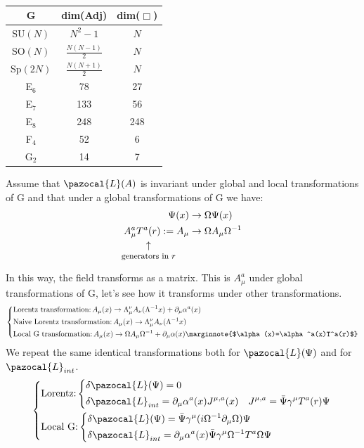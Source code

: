 \documentclass[../main.tex]{subfiles}
\begin{document}
\begin{table}[h]
    \centering
    \begin{tabular}{ccc}
    G & dim(Adj) & dim($\Box$) \\
    \hline
    SU$(N)$ & $N^2-1$ & $N$ \\
    SO$(N)$ & $\frac{N(N-1)}{2}$ & $N$ \\
    Sp$(2N)$ & $\frac{N(N+1)}{2}$ & $N$ \\
    E$_6$ & 78 & 27 \\
    E$_7$ & 133 & 56 \\
    E$_8$ & 248 & 248 \\
    F$_4$ & 52 & 6 \\
    G$_2$ & 14 & 7 \\
    \hline
    \end{tabular}
    \caption*{}
    \label{tab:my_label}
\end{table}
Assume that $\pazocal{L}(A)$ is invariant under global and local transformations of G and that under a global transformations of G we have:
\begin{align*}
\Psi(x)&\to\Omega\Psi(x)\\
A_\mu^a\underset{\mathclap{\tikz \node {$\uparrow$} node [below=1ex] {\footnotesize  generators in $r$};}}{T^a(r)}:=A_\mu&\to\Omega A_\mu\Omega^{-1}
\end{align*}
In this way, the field transforms as a matrix. This is $A_\mu^a$ under global transformations of G, let's see how it transforms under other transformations.
\[
\left\{
\begin{aligned}
&\text{Lorentz transformation:}\, A_\mu(x)\to\Lambda_\mu^\nu A_\nu(\Lambda^{-1}x)+\partial_\mu\alpha^a(x)\\
&\text{Naive Lorentz transformation:}\,A_\mu(x)\to\Lambda_\mu^\nu A_\nu(\Lambda^{-1}x)\\
&\text{Local G transformation:}\,A_\mu(x)\to\Omega A_\mu\Omega^{-1}+\partial_\mu\alpha(x)\marginnote{$\alpha(x)=\alpha^a(x)T^a(r)$}
\end{aligned}
\right.
\]
We repeat the same identical transformations both for $\pazocal{L}(\Psi)$ and for $\pazocal{L}_{int}$.
\[
\left\{
\begin{aligned}
&\text{Lorentz:}\left\{
\begin{aligned}
&\delta\pazocal{L}(\Psi)=0\\
&\delta\pazocal{L}_{int}=\partial_\mu\alpha^a(x)J^{\mu,a}(x) \quad J^{\mu,a}=\Bar{\Psi}\gamma^\mu T^a(r)\Psi
\end{aligned}
\right.\\
&\text{Local G:}\left\{
\begin{aligned}
&\delta\pazocal{L}(\Psi)=\Bar{\Psi}\gamma^\mu(i\Omega^{-1}\partial_\mu\Omega)\Psi\\
&\delta\pazocal{L}_{int}=\partial_\mu\alpha^a(x)\Bar{\Psi}\gamma^\mu\Omega^{-1}T^a\Omega\Psi
\end{aligned}
\right.
\end{aligned}
\right.
\]
\end{document}
